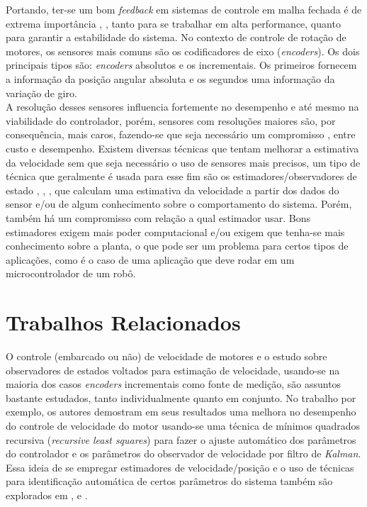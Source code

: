 Portando, ter-se um bom \emph{feedback} em sistemas de controle em malha fechada é de extrema importância \cite{analise_incr_enc}, \cite{simple_speed_feedback}, tanto para se trabalhar em alta performance, quanto para garantir a estabilidade do sistema. No contexto de controle de rotação de motores, os sensores mais comuns são os codificadores de eixo (\emph{encoders}). Os dois principais tipos são: \emph{encoders} absolutos e os incrementais. Os primeiros fornecem a informação da posição angular absoluta e os segundos uma informação da variação de giro. \\

A resolução desses sensores influencia fortemente no desempenho e até mesmo na viabilidade do controlador, porém, sensores com resoluções maiores são, por consequência, mais caros, fazendo-se que seja necessário um compromisso \cite{analise_incr_enc}, \cite{low_precision_encoder01} entre custo e desempenho. Existem diversas técnicas que tentam melhorar a estimativa da velocidade sem que seja necessário o uso de sensores mais precisos, um tipo de técnica que geralmente é usada para esse fim são os estimadores/observadores de estado \cite{analise_incr_enc}, \cite{speed_observer_IA}, \cite{observer_speed}, que calculam uma estimativa da velocidade a partir dos dados do sensor e/ou de algum conhecimento sobre o comportamento do sistema. Porém, também há um compromisso com relação a qual estimador usar. Bons estimadores exigem mais poder computacional e/ou exigem que tenha-se mais conhecimento sobre a planta, o que pode ser um problema para certos tipos de aplicações, como é o caso de uma aplicação que deve rodar em um microcontrolador de um robô.\\

\section{Trabalhos Relacionados}
\label{sec:trabalhos_relacionados}

O controle (embarcado ou não) de velocidade de motores e o estudo sobre observadores de estados voltados para estimação de velocidade, usando-se na maioria dos casos \emph{encoders} incrementais como fonte de medição, são assuntos bastante estudados, tanto individualmente quanto em conjunto. No trabalho \cite{low_precision_encoder01} por exemplo, os autores demostram em seus resultados uma melhora no desempenho do controle de velocidade do motor usando-se uma técnica de mínimos quadrados recursiva (\emph{recursive least squares}) para fazer o ajuste automático dos parâmetros do controlador e os parâmetros do observador de velocidade por filtro de \emph{Kalman}. Essa ideia de se empregar estimadores de velocidade/posição e o uso de técnicas para identificação automática de certos parâmetros do sistema também são explorados em \cite{LOW_SPEED_CONTROL}, \cite{Y_HORI_01} e \cite{Y_HORI_02}.\\

